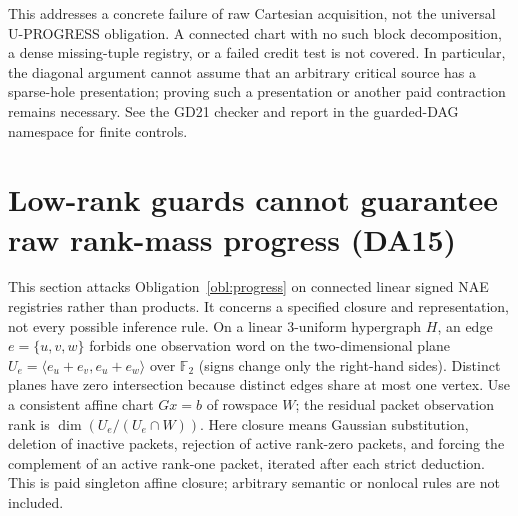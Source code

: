 \documentclass[11pt]{article}
\begin{document}
This addresses a concrete failure of raw Cartesian acquisition, not the universal U-PROGRESS obligation. A connected chart with no such block decomposition, a dense missing-tuple registry, or a failed credit test is not covered. In particular, the diagonal argument cannot assume that an arbitrary critical source has a sparse-hole presentation; proving such a presentation or another paid contraction remains necessary. See the GD21 checker and report in the guarded-DAG namespace for finite controls.

\section{Low-rank guards cannot guarantee raw rank-mass progress (DA15)}\label{sec:da15}
This section attacks Obligation~\ref{obl:progress} on connected linear signed NAE registries rather than products. It concerns a specified closure and representation, not every possible inference rule. On a linear 3-uniform hypergraph $H$, an edge $e=\{u,v,w\}$ forbids one observation word on the two-dimensional plane $U_e=\langle e_u+e_v,e_u+e_w\rangle$ over $\mathbb F_2$ (signs change only the right-hand sides). Distinct planes have zero intersection because distinct edges share at most one vertex. Use a consistent affine chart $Gx=b$ of rowspace $W$; the residual packet observation rank is $\dim(U_e/(U_e\cap W))$. Here closure means Gaussian substitution, deletion of inactive packets, rejection of active rank-zero packets, and forcing the complement of an active rank-one packet, iterated after each strict deduction. This is paid singleton affine closure; arbitrary semantic or nonlocal rules are not included.
\end{document}
